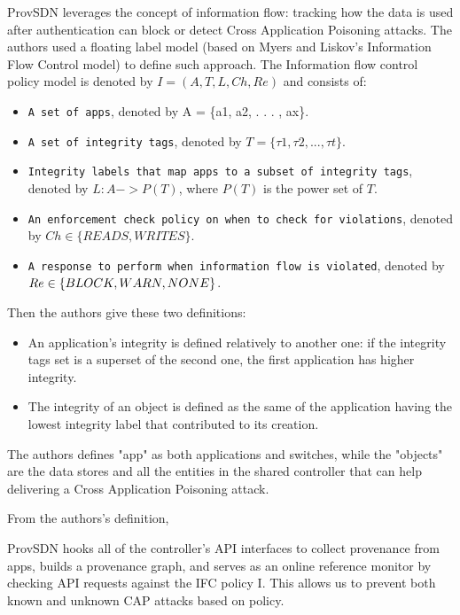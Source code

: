 ProvSDN leverages the concept of information flow: tracking how the data is used after authentication can block or detect Cross Application Poisoning attacks. The authors used a floating label model (based on Myers and Liskov’s Information Flow Control model) to define such approach. The Information flow control policy model is denoted by $I = (A,T, L,Ch, Re)$ and consists of:
\begin{itemize}
    \item\texttt{A set of apps}, denoted by A = \{a1, a2, . . . , ax\}.
    \item\texttt{A set of integrity tags}, denoted by $T = \{\tau1, \tau2, . . . , \tau t\}$.
    \item\texttt{Integrity labels that map apps to a subset of integrity tags}, denoted by $L : A -> P(T)$, where $P(T)$ is the power set of $T$.
    \item\texttt{An enforcement check policy on when to check for violations}, denoted by $Ch \in \{READS, WRITES\}$.
    \item\texttt{A response to perform when information flow is violated}, denoted by $Re \in \\\{BLOCK, WARN, NONE\}$.
\end{itemize}

Then the authors give these two definitions:
\begin{itemize}
    \item An application's integrity is defined relatively to another one: if the integrity tags set is a superset of the second one, the first application has higher integrity.
    \item The integrity of an object is defined as the same of the application having the lowest integrity label that contributed to its creation.
\end{itemize}

The authors defines "app" as both applications and switches, while the "objects" are the data stores and all the entities in the shared controller that can help delivering a Cross Application Poisoning attack. 

From the authors's definition, 
\begin{quoting}[font=itshape, begintext={"}, endtext={"}]
ProvSDN hooks all of the controller’s API interfaces to collect provenance from apps, builds a provenance graph, and serves as an online reference monitor by checking API requests against the IFC policy I. This allows us to prevent both known and unknown CAP attacks based on policy.
\end{quoting}


